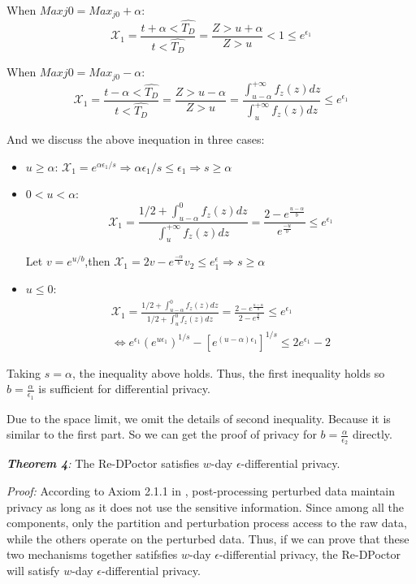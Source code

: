 \documentclass[10pt,conference]{IEEEtran}
\begin{document}
When $Max{j0}=Max_{j0}+\alpha$:
\begin{equation*}\label{case1}
\mathcal{X}_1=\frac{t+\alpha<\hat{T_D}}{t<\hat{T_D}}=\frac{Z>u+\alpha}{Z>u}<1\leq e^{\epsilon_1}
\end{equation*}

When $Max{j0}=Max_{j0}-\alpha$:
\begin{equation*}\label{case1}
\mathcal{X}_1=\frac{t-\alpha<\hat{T_D}}{t<\hat{T_D}}=\frac{Z>u-\alpha}{Z>u}=\frac{\int_{u-\alpha}^{+\infty}f_z(z)dz}{\int_{u}^{+\infty}f_z(z)dz}\leq e^{\epsilon_1}
\end{equation*}

And we discuss the above inequation in three cases:
\begin{itemize}
	\item $u\geq\alpha$:
	$\mathcal{X}_1=e^{\alpha\epsilon_1/s}\Rightarrow \alpha\epsilon_1/s\leq \epsilon_1 \Rightarrow s \geq \alpha$
	\item
	$0<u<\alpha$:
	\begin{equation*}
	\mathcal{X}_1=\frac{1/2+\int_{u-\alpha}^{0}f_z(z)dz}{\int_{u}^{+\infty}f_z(z)dz}=\frac{2-e^{\frac{u-\alpha}{b}}}{e^{\frac{-u}{b}}}\leq e^{\epsilon_1}
	\end{equation*} 
	
	Let $v=e^{u/b}$,then $\mathcal{X}_1=2v-e^{\frac{-\alpha}{b}}v_2\leq e^\epsilon_1 \Rightarrow s\geq \alpha$
	
	\item $u\leq 0$:
	\begin{multline*}
	\mathcal{X}_1=\frac{1/2+\int_{u-\alpha}^{0}f_z(z)dz}{1/2+\int_{u}^{0}f_z(z)dz}=\frac{2-e^{\frac{u-\alpha}{b}}}{2-e^{\frac{u}{b}}}\leq e^{\epsilon_1}\\\Leftrightarrow e^{\epsilon_1}(e^{u\epsilon_1})^{1/s}-[e^{(u-\alpha)\epsilon_1}]^{1/s} \leq 2e^{\epsilon_1}-2
	\end{multline*}
\end{itemize}
Taking $s=\alpha$, the inequality above holds. Thus, the first inequality holds so $b=\frac{\alpha}{\epsilon_1}$ is sufficient for differential privacy. 

Due to the space limit, we omit the details of second inequality. Because it is similar to the first part. So we can get the proof of privacy for $b=\frac{\alpha}{\epsilon_2}$ directly. 

\emph{\textbf{Theorem 4}:} The Re-DPoctor satisfies $w$-day $\epsilon$-differential privacy.

\emph{Proof:} According to Axiom 2.1.1 in \cite{Kifer2010Towards}, post-processing perturbed data maintain privacy as long as it does not use the sensitive information. Since among all the components, only the partition and perturbation process access to the raw data, while the others operate on the perturbed data.  Thus, if we can prove that these two mechanisms together satifsfies $w$-day $\epsilon$-differential privacy, the Re-DPoctor will satisfy $w$-day $\epsilon$-differential privacy.
\end{document}
